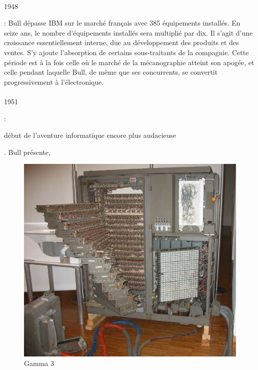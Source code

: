 \documentclass{article}
\begin{document}
		\paragraph{}
		\begin{bf}1948\end{bf}: Bull dépasse IBM sur le marché français avec 385 équipements installés. En seize ans, 
		le nombre d’équipements installés sera multiplié par dix. Il s'agit d'une croissance essentiellement interne, due au 
		développement des produits et des ventes. S'y ajoute l'absorption de certains sous-traitants de la compagnie. Cette 
		période est à la fois celle où le marché de la mécanographie atteint son apogée, et celle pendant laquelle Bull, de 
		même que ses concurrents, se convertit progressivement à l'électronique.
		\newline{}
		\paragraph{}
		\begin{bf}1951\end{bf}: \begin{bf}début de l’aventure informatique encore plus audacieuse\end{bf}. Bull présente, 
		\begin{figure}
		\includegraphics[scale=0.15]{gamma3.jpg}
		\caption{Gamma 3}
		\end{figure}
\end{document}
